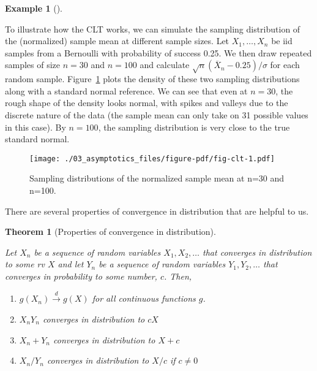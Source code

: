 \documentclass[
  letterpaper,
  DIV=11,
  numbers=noendperiod]{scrreprt}
\providecommand{\tightlist}{%
  \setlength{\itemsep}{0pt}\setlength{\parskip}{0pt}}\usepackage{longtable,booktabs,array}
\newcommand{\Xbar}{\overline{X}}
\newcommand{\indist}{\overset{d}{\to}}
\theoremstyle{definition}
\theoremstyle{plain}
\newtheorem{theorem}{Theorem}[chapter]
\theoremstyle{definition}
\newtheorem{example}{Example}[chapter]
\theoremstyle{remark}
\begin{document}
\leavevmode{}%
\begin{example}[]\label{exm-bin-clt}

To illustrate how the CLT works, we can simulate the sampling
distribution of the (normalized) sample mean at different sample sizes.
Let \(X_1, \ldots, X_n\) be iid samples from a Bernoulli with
probability of success 0.25. We then draw repeated samples of size
\(n=30\) and \(n=100\) and calculate \(\sqrt{n}(\Xbar_n - 0.25)/\sigma\)
for each random sample. Figure~\ref{fig-clt} plots the density of these
two sampling distributions along with a standard normal reference. We
can see that even at \(n=30\), the rough shape of the density looks
normal, with spikes and valleys due to the discrete nature of the data
(the sample mean can only take on 31 possible values in this case). By
\(n=100\), the sampling distribution is very close to the true standard
normal.

\begin{figure}

{\centering \texttt{[image: ./03\_asymptotics\_files/figure-pdf/fig-clt-1.pdf]}

}

\caption{\label{fig-clt}Sampling distributions of the normalized sample
mean at n=30 and n=100.}

\end{figure}

\end{example}

There are several properties of convergence in distribution that are
helpful to us.

\leavevmode{}%
\begin{theorem}[Properties of convergence in
distribution]\label{thm-indist-properties}

Let \(X_n\) be a sequence of random variables \(X_1,X_2,\ldots\) that
converges in distribution to some rv \(X\) and let \(Y_n\) be a sequence
of random variables \(Y_1,Y_2,\ldots\) that converges in probability to
some number, \(c\). Then,

\begin{enumerate}
\def\labelenumi{\arabic{enumi}.}
\tightlist
\item
  \(g(X_n) \indist g(X)\) for all continuous functions \(g\).
\item
  \(X_nY_n\) converges in distribution to \(cX\)
\item
  \(X_n + Y_n\) converges in distribution to \(X + c\)
\item
  \(X_n / Y_n\) converges in distribution to \(X / c\) if \(c \neq 0\)
\end{enumerate}

\end{theorem}
\end{document}
